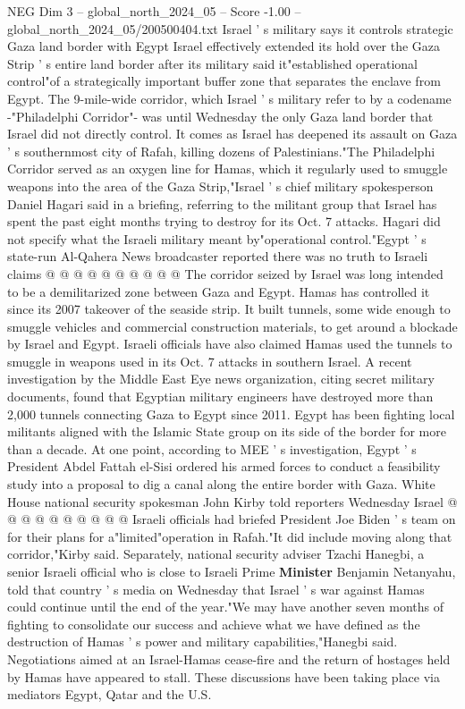 \begin{textsample}{NEG Dim 3 – global\_north\_2024\_05 – Score -1.00 – global\_north\_2024\_05/200500404.txt}  \label{ex:f3_neg_439}
Israel ' s military says it controls strategic Gaza land border with Egypt Israel effectively extended its hold over the Gaza Strip ' s entire land border after its military said it"established operational control"of a strategically important buffer zone that separates the enclave from Egypt.
The 9-mile-wide corridor, which Israel ' s military refer to by a codename -"Philadelphi Corridor"- was until Wednesday the only Gaza land border that Israel did not directly control.
It comes as Israel has deepened its assault on Gaza ' s southernmost city of Rafah, killing dozens of Palestinians."The Philadelphi Corridor served as an oxygen line for Hamas, which it regularly used to smuggle weapons into the area of the Gaza Strip,"Israel ' s chief military spokesperson Daniel Hagari said in a briefing, referring to the militant group that Israel has spent the past eight months trying to destroy for its Oct. 7 attacks.
Hagari did not specify what the Israeli military meant by"operational control."Egypt ' s state-run Al-Qahera News broadcaster reported there was no truth to Israeli claims @ @ @ @ @ @ @ @ @ @ The corridor seized by Israel was long intended to be a demilitarized zone between Gaza and Egypt.
Hamas has controlled it since its 2007 takeover of the seaside strip.
It built tunnels, some wide enough to smuggle vehicles and commercial construction materials, to get around a blockade by Israel and Egypt.
Israeli officials have also claimed Hamas used the tunnels to smuggle in weapons used in its Oct. 7 attacks in southern Israel.
A recent investigation by the Middle East Eye news organization, citing secret military documents, found that Egyptian military engineers have destroyed more than 2,000 tunnels connecting Gaza to Egypt since 2011.
Egypt has been fighting local militants aligned with the Islamic State group on its side of the border for more than a decade.
At one point, according to MEE ' s investigation, Egypt ' s President Abdel Fattah el-Sisi ordered his armed forces to conduct a feasibility study into a proposal to dig a canal along the entire border with Gaza.
White House national security spokesman John Kirby told reporters Wednesday Israel @ @ @ @ @ @ @ @ @ @ Israeli officials had briefed President Joe Biden ' s team on for their plans for a"limited"operation in Rafah."It did include moving along that corridor,"Kirby said.
Separately, national security adviser Tzachi Hanegbi, a senior Israeli official who is close to Israeli Prime \textbf{Minister} Benjamin Netanyahu, told that country ' s media on Wednesday that Israel ' s war against Hamas could continue until the end of the year."We may have another seven months of fighting to consolidate our success and achieve what we have defined as the destruction of Hamas ' s power and military capabilities,"Hanegbi said.
Negotiations aimed at an Israel-Hamas cease-fire and the return of hostages held by Hamas have appeared to stall.
These discussions have been taking place via mediators Egypt, Qatar and the U.S.

\end{textsample}
